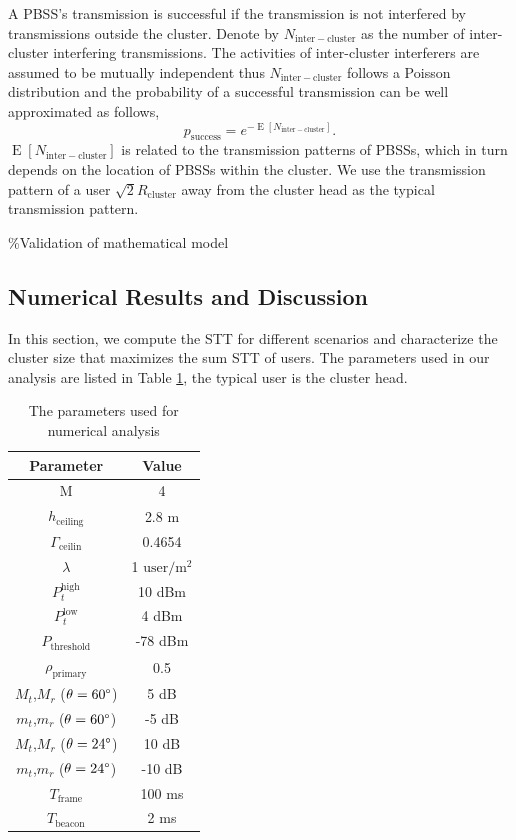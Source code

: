\documentclass[10pt, conference, letterpaper]{IEEEtran}
\DeclareMathOperator*{\E}{\mathrm{E}}
\begin{document}
A PBSS's transmission is successful if the transmission is not interfered by transmissions outside the cluster. 
Denote by $N_{\mathrm{inter-cluster}}$ as the number of inter-cluster interfering transmissions. 
The activities of inter-cluster interferers are assumed to be mutually independent thus $N_{\mathrm{inter-cluster}}$ follows a Poisson distribution and the probability of a successful transmission can be well approximated as follows, 
\begin{equation*}
p_{\mathrm{success}} = e^{-\E[N_{\mathrm{inter-cluster}}]}.
\end{equation*} 
$\E[N_{\mathrm{inter-cluster}}]$ is related to the transmission patterns of PBSSs, which in turn depends on the location of PBSSs within the cluster. 
We use the transmission pattern of a user $\sqrt{2}R_{\mathrm{cluster}}$ away from the cluster head as the typical transmission pattern.

\%Validation of mathematical model

\subsection{Numerical Results and Discussion}
In this section, we compute the STT for different scenarios and characterize the cluster size that maximizes the sum STT of users. 
The parameters used in our analysis are listed in Table \ref{tab:clusteranalysis:parameter}, the typical user is the cluster head. 

\begin{table}
	\centering
	\caption{The parameters used for numerical analysis}
	\begin{tabular}{cc}
		\hline
		Parameter & Value \\
		\hline
		M & 4 \\
		$h_{\mathrm{ceiling}}$ & 2.8 m \\
		$\Gamma_{\mathrm{ceilin}}$ & 0.4654 \\
		$\lambda$ & 1 $\mathrm{user/m^2}$ \\
		$P_t^{\mathrm{high}}$ & 10 dBm \\
		$P_t^{\mathrm{low}}$ & 4 dBm \\
		$P_{\mathrm{threshold}}$ & -78 dBm \\
		$\rho_{\mathrm{primary}}$ & 0.5 \\
		$M_t$,$M_r$ ($\theta = 60\degree$) & 5 dB \\
		$m_t$,$m_r$ ($\theta = 60\degree$) & -5 dB \\
		$M_t$,$M_r$ ($\theta = 24\degree$) & 10 dB \\
		$m_t$,$m_r$ ($\theta = 24\degree$) & -10 dB \\		
		$T_{\mathrm{frame}}$ & 100 ms \\
		$T_{\mathrm{beacon}}$ & 2 ms \\
		\hline
	\end{tabular}
	\label{tab:clusteranalysis:parameter}	
\end{table}
\end{document}
